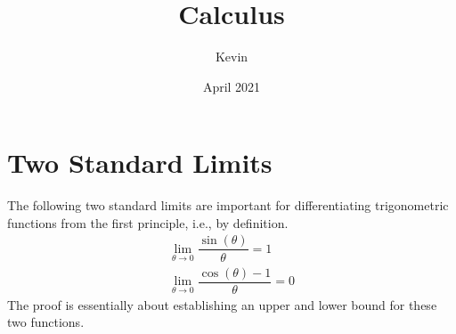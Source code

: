 \documentclass{article}
\title{Calculus}
\author{Kevin }
\date{April 2021}
\theoremstyle{definition}
\theoremstyle{definition}
\theoremstyle{definition}
\theoremstyle{definition}
\theoremstyle{definition}
\theoremstyle{definition}
\theoremstyle{definition}
\theoremstyle{definition}
\theoremstyle{definition}
\begin{document}
\maketitle
\tableofcontents
\section{Two Standard Limits}
The following two standard limits are important for differentiating trigonometric functions from the first principle, i.e., by definition.
\begin{align}
    \lim_{\theta\to0}\dfrac{\sin(\theta)}{\theta}=1\\
    \lim_{\theta\to0}\dfrac{\cos(\theta)-1}{\theta}=0
\end{align}
The proof is essentially about establishing an upper and lower bound for these two functions.
\end{document}
